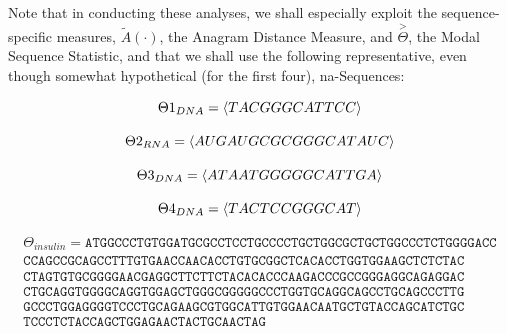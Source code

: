 \documentclass[a4paper, 18pt]{book} %
\begin{document}
Note that in conducting these analyses, we shall especially exploit the sequence-specific measures, $\tilde{A}(\cdot)$, the Anagram Distance Measure\cite{adtpaper}\cite{transformatics}, and $\overset{>}{\Theta}$, the Modal Sequence Statistic\cite{transformatics}, and that we shall use the following representative, even though somewhat hypothetical (for the first four), na-Sequences:

\begin{equation}
{\Theta1}_{DNA} = \langle TAC GGG CAT TCC \rangle\\
\end{equation}

\begin{equation}
{\Theta2}_{RNA} = \langle AUG AUG CGC GGG CAT AUC \rangle\\
\end{equation}

\begin{equation}
{\Theta3}_{DNA} = \langle ATA ATGG GGG CAT TGA \rangle\\
\end{equation}

\begin{equation}
{\Theta4}_{DNA} = \langle TAC TCC GGG CAT\rangle\\
\end{equation}

\begin{multline}
\Theta_{insulin} =  \texttt{ATGGCCCTGTGGATGCGCCTCCTGCCCCTGCTGGCGCTGCTGGCCCTCTGGGGACC}\\
\texttt{CCAGCCGCAGCCTTTGTGAACCAACACCTGTGCGGCTCACACCTGGTGGAAGCTCTCTAC}\\
\texttt{CTAGTGTGCGGGGAACGAGGCTTCTTCTACACACCCAAGACCCGCCGGGAGGCAGAGGAC}\\
\texttt{CTGCAGGTGGGGCAGGTGGAGCTGGGCGGGGGCCCTGGTGCAGGCAGCCTGCAGCCCTTG}\\
\texttt{GCCCTGGAGGGGTCCCTGCAGAAGCGTGGCATTGTGGAACAATGCTGTACCAGCATCTGC}\\
\texttt{TCCCTCTACCAGCTGGAGAACTACTGCAACTAG}
\end{multline}
\end{document}
